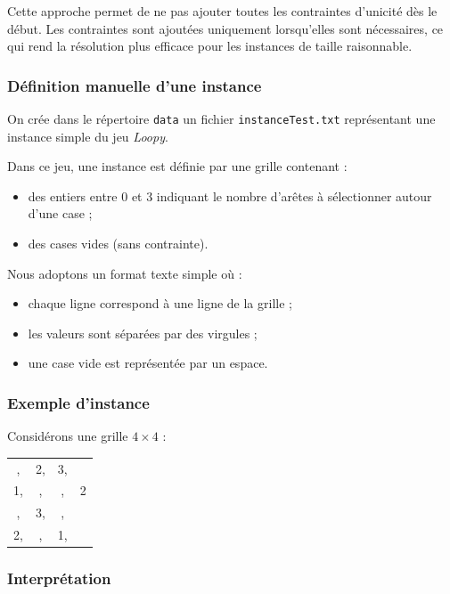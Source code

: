 Cette approche permet de ne pas ajouter toutes les contraintes d'unicité dès le début. Les contraintes sont ajoutées uniquement lorsqu'elles sont nécessaires, ce qui rend la résolution plus efficace pour les instances de taille raisonnable.

\subsubsection{Définition manuelle d’une instance}

On crée dans le répertoire \texttt{data} un fichier \texttt{instanceTest.txt} représentant une instance simple du jeu \textit{Loopy}. 

Dans ce jeu, une instance est définie par une grille contenant :
\begin{itemize}
    \item des entiers entre 0 et 3 indiquant le nombre d’arêtes à sélectionner autour d’une case ;
    \item des cases vides (sans contrainte).
\end{itemize}

Nous adoptons un format texte simple où :
\begin{itemize}
    \item chaque ligne correspond à une ligne de la grille ;
    \item les valeurs sont séparées par des virgules ;
    \item une case vide est représentée par un espace.
\end{itemize}

\subsubsection{Exemple d’instance}

Considérons une grille \(4 \times 4\) :

\begin{center}
\ttfamily
\begin{tabular}{cccc}
 , & 2, & 3, &  \\
 1, &  , &  , & 2 \\
 , & 3, &  , &  \\
 2, &  , & 1, &  
\end{tabular}
\end{center}



\subsubsection{Interprétation}

